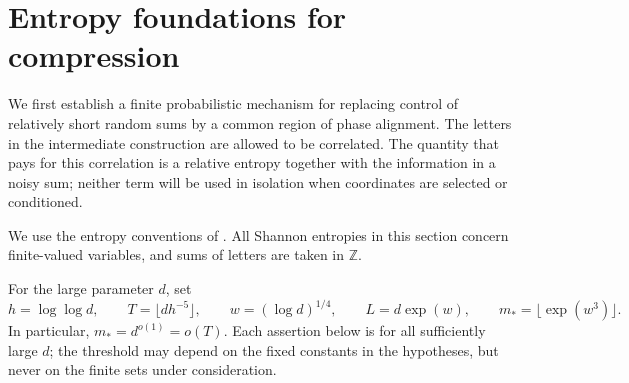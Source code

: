 \section{Entropy foundations for compression}
\label{sec:entropy-foundations}

We first establish a finite probabilistic mechanism for replacing control of
relatively short random sums by a common region of phase alignment.  The
letters in the intermediate construction are allowed to be correlated.  The
quantity that pays for this correlation is a relative entropy together with
the information in a noisy sum; neither term will be used in isolation when
coordinates are selected or conditioned.

We use the entropy conventions of . All Shannon
entropies in this section concern finite-valued variables, and sums of letters
are taken in $\mathbb Z$.

For the large parameter $d$, set
\begin{equation}
\label{entropy-foundations:parameters}
 h=\log\log d,\qquad T=\lfloor d h^{-5}\rfloor,\qquad
 w=(\log d)^{1/4},\qquad L=d\exp(w),\qquad
 m_*=\lfloor\exp(w^3)\rfloor.
\end{equation}
In particular, $m_*=d^{o(1)}=o(T)$.  Each assertion below is for all
sufficiently large $d$; the threshold may depend on the fixed constants in
the hypotheses, but never on the finite sets under consideration.

